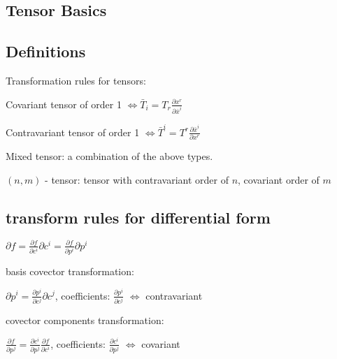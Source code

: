 \documentclass[8pt,letter]{article}
\begin{document}


\begin{multicols*}{2}

  \section{Tensor Basics}

  \subsection{Definitions}

  Transformation rules for tensors:
  
  Covariant tensor of order 1 $\iff \bar{T}_i = T_r \frac{\partial x^r}{\partial \bar{x}^i}$

  Contravariant tensor of order 1 $\iff \bar{T}^i = T^r \frac{\partial \bar{x}^i}{\partial x^r}$

  Mixed tensor: a combination of the above types.

  $(n,m)$ - tensor: tensor with contravariant order of $n$, covariant order of $m$

  \subsection{transform rules for differential form}

  $\partial f = \frac{\partial f}{\partial c^i} \partial c^i = \frac{\partial f}{\partial p^i} \partial p^i$

  basis covector transformation:

  $\partial p^i = \frac{\partial p^i}{\partial c^j} \partial c^j$, coefficients: $\frac{\partial p^i}{\partial c^j}$ $\iff$ contravariant

  covector components transformation:

  $\frac{\partial f}{\partial p^j} = \frac{\partial c^i}{\partial p^j} \frac{\partial f}{\partial c^i}$, coefficients: $\frac{\partial c^i}{\partial p^j}$ $\iff$ covariant


\end{multicols*}
\end{document}
